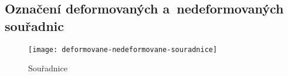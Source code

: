 
\subsection{Označení deformovaných a~nedeformovaných souřadnic}

\begin{figure}[H]
	\centering
	\texttt{[image: deformovane-nedeformovane-souradnice]}
	\caption{Souřadnice}
	\label{fig:deformovane-nedeformovane-souradnice}
\end{figure}

